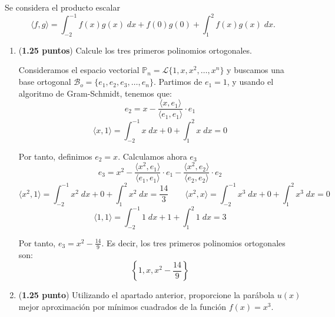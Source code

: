 \documentclass[12pt]{article}
\begin{document}
\begin{ejercicio} 
    Se considera el producto escalar
    \begin{equation*}
        \langle f,g \rangle = \int_{-2}^{-1} f(x) g(x)\;dx + f(0) g(0) +\int_1^2f(x)g(x)\;dx.
    \end{equation*}

    \begin{enumerate}
        \item (\textbf{1.25 puntos}) Calcule los tres primeros polinomios ortogonales.

        Consideramos el espacio vectorial $\mathbb{P}_n=\mathcal{L}\{1,x,x^2,\dots, x^n\}$ y buscamos una base ortogonal $\mathcal{B}_o = \{e_1, e_2, e_3, \dots, e_n\}$. Partimos de $e_1=1$, y usando el algoritmo de Gram-Schmidt, tenemos que:
        \begin{equation*}
            e_2 = x-\frac{\langle x, e_1\rangle}{\langle e_1, e_1\rangle} \cdot e_1
        \end{equation*}
        \begin{equation*}
            \langle x,1\rangle = \int_{-2}^{-1} x\;dx + 0 +\int_1^2 x\;dx = 0
        \end{equation*}

        Por tanto, definimos $e_2=x$. Calculamos ahora $e_3$
        \begin{equation*}
            e_3 = x^2-\frac{\langle x^2, e_1\rangle}{\langle e_1, e_1\rangle} \cdot e_1 -\frac{\langle x^2, e_2\rangle}{\langle e_2, e_2\rangle} \cdot e_2
        \end{equation*}
        \begin{equation*}
            \langle x^2,1\rangle = \int_{-2}^{-1} x^2\;dx + 0 +\int_1^2 x^2\;dx = \frac{14}{3}
            \qquad
            \langle x^2,x\rangle = \int_{-2}^{-1} x^3\;dx + 0 +\int_1^2 x^3\;dx = 0
        \end{equation*}
        \begin{equation*}
            \langle 1,1\rangle = \int_{-2}^{-1} 1\;dx + 1 +\int_1^2 1\;dx = 3
        \end{equation*}

        Por tanto, $e_3=x^2-\frac{14}{9}$. Es decir, los tres primeros polinomios ortogonales son:
        \begin{equation*}
            \left\{1,x,x^2-\frac{14}{9}\right\}
        \end{equation*}

        
        \item (\textbf{1.25 punto}) Utilizando el apartado anterior, proporcione la parábola $u(x)$ mejor aproximación por mínimos cuadrados de la función $f(x) = x^3$.


\end{enumerate}
\end{ejercicio}
\end{document}
